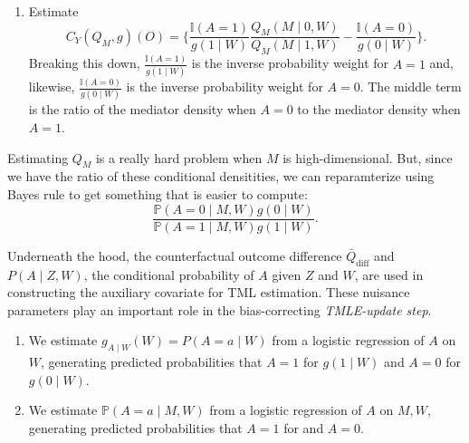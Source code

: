 \documentclass[
  12pt, krantz2,
]{book}
\providecommand{\tightlist}{%
  \setlength{\itemsep}{0pt}\setlength{\parskip}{0pt}}
\theoremstyle{definition}
\theoremstyle{definition}
\theoremstyle{definition}
\renewcommand{\P}{\mathbb{P}}
\newcommand{\I}{\mathbb{I}}
\newcommand{\1}{\mathbbm{1}}
\begin{document}
\begin{enumerate}
\def\labelenumi{\arabic{enumi}.}
\tightlist
\item
  Estimate
  \begin{equation*}
   C_Y(Q_M, g)(O) = \Bigg\{\frac{\I(A = 1)}{g(1 \mid W)}
     \frac{Q_M(M \mid 0, W)}{Q_M(M \mid 1, W)} -
     \frac{\I(A = 0)}{g(0 \mid W)} \Bigg\}.
    \end{equation*}
  Breaking this down, \(\frac{\I(A = 1)}{g(1 \mid W)}\) is the inverse probability
  weight for \(A = 1\) and, likewise, \(\frac{\I(A = 0)}{g(0 \mid W)}\) is the inverse
  probability weight for \(A = 0\). The middle term is the ratio of the mediator
  density when \(A = 0\) to the mediator density when \(A = 1\).
\end{enumerate}

Estimating \(Q_M\) is a really hard problem when \(M\) is high-dimensional. But,
since we have the ratio of these conditional densitities, we can reparamterize
using Bayes rule to get something that is easier to compute:
\begin{equation*}
  \frac{\P(A = 0 \mid M, W) g(0 \mid W)}{\P(A = 1 \mid M, W) g(1 \mid W)}.
\end{equation*}

Underneath the hood, the counterfactual outcome difference
\(\bar{Q}_{\text{diff}}\) and \(P(A \mid Z, W)\), the conditional probability of \(A\)
given \(Z\) and \(W\), are used in constructing the auxiliary covariate for TML
estimation. These nuisance parameters play an important role in the
bias-correcting \emph{TMLE-update step}.

\begin{enumerate}
\def\labelenumi{\arabic{enumi}.}
\tightlist
\item
  We estimate \(g_{A \mid W}(W)=P(A=a \mid W)\) from a logistic regression of
  \(A\) on \(W\), generating predicted probabilities that \(A=1\) for \(g(1 \mid W)\)
  and \(A=0\) for \(g(0 \mid W)\).\\
\item
  We estimate \(\P(A=a \mid M, W)\) from a logistic regression of \(A\) on \(M, W\),
  generating predicted probabilities that \(A=1\) for and \(A=0\).
\end{enumerate}
\end{document}
